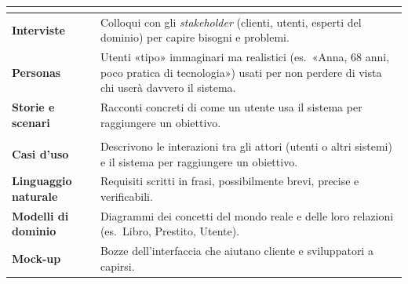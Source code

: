 \begin{table}[H]
\centering
\renewcommand{\arraystretch}{1.4}
\begin{tabularx}{\textwidth}{>{\bfseries}P{3.4cm} L}
\toprule
{} \\
\midrule
Interviste & Colloqui con gli \textit{stakeholder} (clienti, utenti, esperti del dominio) per capire bisogni e problemi. \\
Personas & Utenti «tipo» immaginari ma realistici (es.\ «Anna, 68 anni, poco pratica di tecnologia») usati per non perdere di vista chi userà davvero il sistema. \\
Storie e scenari & Racconti concreti di come un utente usa il sistema per raggiungere un obiettivo. \\
\midrule
{} \\
\midrule
Casi d'uso & Descrivono le interazioni tra gli attori (utenti o altri sistemi) e il sistema per raggiungere un obiettivo. \\
Linguaggio naturale & Requisiti scritti in frasi, possibilmente brevi, precise e verificabili. \\
Modelli di dominio & Diagrammi dei concetti del mondo reale e delle loro relazioni (es.\ Libro, Prestito, Utente). \\
Mock-up & Bozze dell'interfaccia che aiutano cliente e sviluppatori a capirsi. \\
\bottomrule
\end{tabularx}
\end{table}


